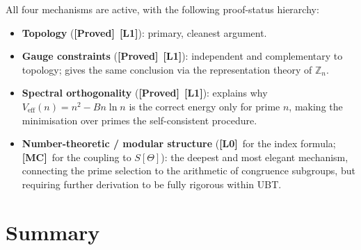 \documentclass[12pt,a4paper]{article}
\theoremstyle{definition}
\theoremstyle{remark}
\newcommand{\ZZ}{\mathbb{Z}}
\newcommand{\PROVED}{\textbf{[Proved]}}
\newcommand{\MC}{\textbf{[MC]}}
\newcommand{\Lone}{\textbf{[L1]}}
\newcommand{\Lzero}{\textbf{[L0]}}
\begin{document}
\begin{enumerate}
  All four mechanisms are active, with the following proof-status hierarchy:
  \begin{itemize}
    \item \textbf{Topology} (\PROVED\ \Lone): primary, cleanest argument.
    \item \textbf{Gauge constraints} (\PROVED\ \Lone): independent and
          complementary to topology; gives the same conclusion via the
          representation theory of $\ZZ_n$.
    \item \textbf{Spectral orthogonality} (\PROVED\ \Lone): explains why
          $V_{\mathrm{eff}}(n) = n^2 - Bn\ln n$ is the correct energy only for
          prime $n$, making the minimisation over primes the self-consistent
          procedure.
    \item \textbf{Number-theoretic / modular structure} (\Lzero\ for the index
          formula; \MC\ for the coupling to $S[\Theta]$): the deepest and most
          elegant mechanism, connecting the prime selection to the arithmetic of
          congruence subgroups, but requiring further derivation to be fully
          rigorous within UBT.
  \end{itemize}

\end{enumerate}

\section{Summary}
\label{sec:psp:summary}
\end{document}
